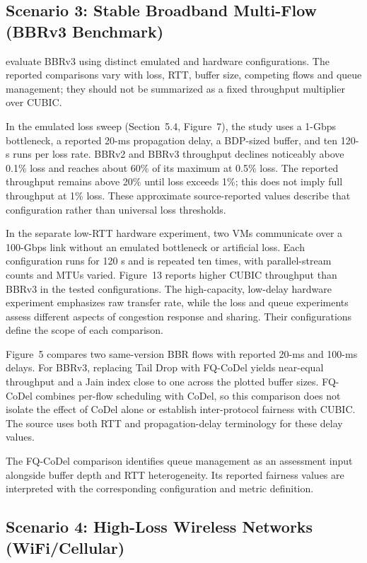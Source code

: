 \documentclass[a4paper,fleqn]{cas-sc}
\begin{document}
\FloatBarrier

\subsection{Scenario 3: Stable Broadband Multi-Flow (BBRv3 Benchmark)}
\label{sec:bbr3}

\citet{gomez2024bbrv3} evaluate BBRv3 using distinct emulated and
hardware configurations. The reported comparisons vary with loss, RTT,
buffer size, competing flows and queue management; they should not be
summarized as a fixed throughput multiplier over CUBIC.

In the emulated loss sweep (Section~5.4, Figure~7), the study uses a
1-Gbps bottleneck, a reported 20-ms propagation delay, a BDP-sized buffer,
and ten 120-s runs per loss rate. BBRv2 and BBRv3 throughput declines
noticeably above 0.1\% loss and reaches about 60\% of its maximum at
0.5\% loss. The reported throughput remains above 20\% until loss exceeds
1\%; this does not imply full throughput at 1\% loss. These approximate
source-reported values describe that configuration rather than universal
loss thresholds.

In the separate low-RTT hardware experiment, two VMs communicate over a
100-Gbps link without an emulated bottleneck or artificial loss. Each
configuration runs for 120 s and is repeated ten times, with parallel-stream
counts and MTUs varied. Figure~13 reports higher CUBIC throughput than
BBRv3 in the tested configurations. The high-capacity, low-delay hardware experiment emphasizes raw transfer
rate, while the loss and queue experiments assess different aspects of
congestion response and sharing. Their configurations define the scope
of each comparison.

Figure~5 compares two same-version BBR flows with reported 20-ms and
100-ms delays. For BBRv3, replacing Tail Drop with FQ-CoDel yields
near-equal throughput and a Jain index close to one across the plotted
buffer sizes. FQ-CoDel combines per-flow scheduling with CoDel, so this
comparison does not isolate the effect of CoDel alone or establish
inter-protocol fairness with CUBIC. The source uses both RTT and
propagation-delay terminology for these delay values.

The FQ-CoDel comparison identifies queue management as an assessment input
alongside buffer depth and RTT heterogeneity. Its reported fairness values
are interpreted with the corresponding configuration and metric definition.

\subsection{Scenario 4: High-Loss Wireless Networks (WiFi/Cellular)}
\label{sec:wireless_loss}
\end{document}
